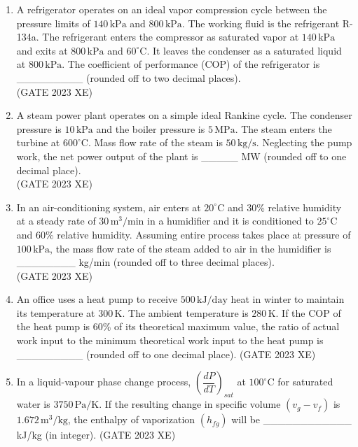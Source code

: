 \documentclass[journal,12pt,onecolumn]{IEEEtran}
\begin{document}
\begin{enumerate}
\item A refrigerator operates on an ideal vapor compression cycle between the pressure limits of $140\,\mathrm{kPa}$ and $800\,\mathrm{kPa}$. The working fluid is the refrigerant R-134a. The refrigerant enters the compressor as saturated vapor at $140\,\mathrm{kPa}$ and exits at $800\,\mathrm{kPa}$ and $60^{\circ}\mathrm{C}$. It leaves the condenser as a saturated liquid at $800\,\mathrm{kPa}$. The coefficient of performance (COP) of the refrigerator is \_\_\_\_\_\_\_\_\_ (rounded off to two decimal places). \\
\hfill{(GATE 2023 XE)}

\item A steam power plant operates on a simple ideal Rankine cycle. The condenser pressure is $10\,\mathrm{kPa}$ and the boiler pressure is $5\,\mathrm{MPa}$. The steam enters the turbine at $600^{\circ}\mathrm{C}$. Mass flow rate of the steam is $50\,\mathrm{kg/s}$. Neglecting the pump work, the net power output of the plant is \_\_\_\_\_ MW (rounded off to one decimal place). \\
\hfill{(GATE 2023 XE)}

\item In an air-conditioning system, air enters at $20^{\circ}\mathrm{C}$ and 30\% relative humidity at a steady rate of $30\,\mathrm{m^3/min}$ in a humidifier and it is conditioned to $25^{\circ}\mathrm{C}$ and 60\% relative humidity. Assuming entire process takes place at pressure of $100\,\mathrm{kPa}$, the mass flow rate of the steam added to air in the humidifier is \_\_\_\_\_\_\_\_ kg/min (rounded off to three decimal places). \\
\hfill{(GATE 2023 XE)}

\item An office uses a heat pump to receive $500\,\mathrm{kJ/day}$ heat in winter to maintain its temperature at $300\,\mathrm{K}$. The ambient temperature is $280\,\mathrm{K}$. If the COP of the heat pump is 60\% of its theoretical maximum value, the ratio of actual work input to the minimum theoretical work input to the heat pump is \_\_\_\_\_\_\_\_\_ (rounded off to one decimal place).
\hfill{(GATE 2023 XE)}

\item In a liquid-vapour phase change process, $\left(\dfrac{dP}{dT}\right)_{sat}$ at $100^{\circ}\mathrm{C}$ for saturated water is $3750\,\mathrm{Pa/K}$. If the resulting change in specific volume $(v_g-v_f)$ is $1.672\,\mathrm{m^3/kg}$, the enthalpy of vaporization $(h_{fg})$ will be \_\_\_\_\_\_\_\_\_\_\_\_ kJ/kg (in integer).
\hfill{(GATE 2023 XE)}

\end{enumerate}
\end{document}
